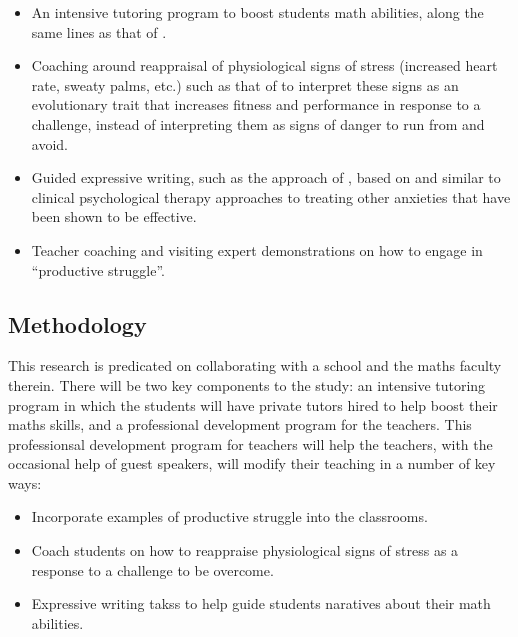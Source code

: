 \documentclass[14pt]{memoir}
\begin{document}
\begin{itemize}
	\item An intensive tutoring program to boost students math abilities, along the same lines as that of .
	\item Coaching around reappraisal of physiological signs of stress (increased heart rate, sweaty palms, etc.) such as that of  to interpret these signs as an evolutionary trait that increases fitness and performance in response to a challenge, instead of interpreting them as signs of danger to run from and avoid.
	\item Guided expressive writing, such as the approach of , based on and similar to clinical psychological therapy approaches to treating other anxieties that have been shown to be effective.
	\item Teacher coaching and visiting expert demonstrations on how to engage in ``productive struggle''.
\end{itemize}

\subsection*{Methodology}

This research is predicated on collaborating with a school and the maths faculty therein. There will be two key components to the study: an intensive tutoring program in which the students will have private tutors hired to help boost their maths skills, and a professional development program for the teachers. This professionsal development program for teachers will help the teachers, with the occasional help of guest speakers, will modify their teaching in a number of key ways:
\begin{itemize}
	\item Incorporate examples of productive struggle into the classrooms.
	\item Coach students on how to reappraise physiological signs of stress as a response to a challenge to be overcome.
	\item Expressive writing takss to help guide students naratives about their math abilities.
\end{itemize}
\end{document}
